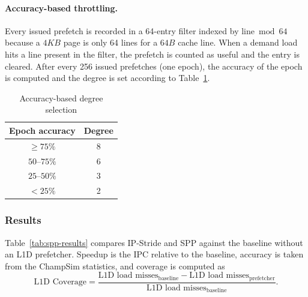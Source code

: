 \documentclass[11pt,a4paper]{article}
\begin{document}
  \paragraph{Accuracy-based throttling.} Every issued prefetch is
  recorded in a 64-entry filter indexed by $\text{line} \bmod 64$ because a $4KB$ page is only 64 lines for a $64B$ cache line. When a
  demand load hits a line present in the filter, the prefetch is counted
  as useful and the entry is cleared. After every 256 issued prefetches
  (one epoch), the accuracy of the epoch is computed and the degree is
  set according to Table~\ref{tab:throttle}.

  \begin{table}[H]
    \centering
    \caption{Accuracy-based degree selection}
    \label{tab:throttle}
    \begin{tabular}{@{}cc@{}}
      \toprule
      \textbf{Epoch accuracy} & \textbf{Degree} \\
      \midrule
      $\geq 75\%$   & 8 \\
      $50$--$75\%$  & 6 \\
      $25$--$50\%$  & 3 \\
      $< 25\%$      & 2 \\
      \bottomrule
    \end{tabular}
  \end{table}

 \subsubsection{Results}

  Table~\ref{tab:spp-results} compares IP-Stride and SPP against the
  baseline without an L1D prefetcher. Speedup is the IPC relative to the
  baseline, accuracy is taken from the ChampSim statistics, and coverage
  is computed as
  \[
    \text{L1D Coverage} =
    \frac{\text{L1D load misses}_{\text{baseline}} -
          \text{L1D load misses}_{\text{prefetcher}}}
         {\text{L1D load misses}_{\text{baseline}}}.
  \]
\end{document}
